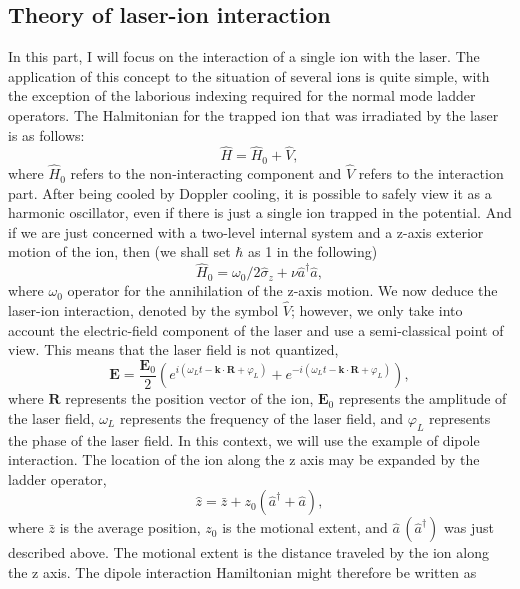 \subsection{Theory of laser-ion interaction}

In this part, I will focus on the interaction of a single ion with the laser. The application of this concept to the situation of several ions is quite simple, with the exception of the laborious indexing required for the normal mode ladder operators. The Halmitonian for the trapped ion that was irradiated by the laser is as follows:
\begin{equation}
    \hat{H} = \hat{H}_0 + \hat{V},
\end{equation}
where $\hat{H}_0$ refers to the non-interacting component and $\hat{V}$ refers to the interaction part. After being cooled by Doppler cooling, it is possible to safely view it as a harmonic oscillator, even if there is just a single ion trapped in the potential. And if we are just concerned with a two-level internal system and a z-axis exterior motion of the ion, then (we shall set $\hbar$ as 1 in the following)
\begin{equation}
    \hat{H}_0=\omega_0 /2 \hat{\sigma}_z + \nu \hat{a}^{\dagger} \hat{a},
\end{equation}
where $\omega_0$ operator for the annihilation of the z-axis motion. We now deduce the laser-ion interaction, denoted by the symbol $\hat{V}$; however, we only take into account the electric-field component of the laser and use a semi-classical point of view. This means that the laser field is not quantized,
\begin{equation}
    \mathbf{E}=\frac{\mathbf{E}_0}{2}\left(e^{i\left(\omega_L t-\mathbf{k} \cdot \mathbf{R}+\varphi_L\right)}+e^{-i\left(\omega_L t-\mathbf{k} \cdot \mathbf{R}+\varphi_L\right)}\right),
\end{equation}
where $\mathbf{R}$ represents the position vector of the ion, $\mathbf{E}_0$ represents the amplitude of the laser field, $\omega_L$ represents the frequency of the laser field, and $\varphi_L$ represents the phase of the laser field. In this context, we will use the example of dipole interaction. The location of the ion along the z axis may be expanded by the ladder operator,
\begin{equation}
    \hat{z}=\bar{z} + z_0 (\hat{a}^{\dagger}+\hat{a}),
\end{equation}
where $\bar{z}$ is the average position, $z_0$ is the motional extent, and $\hat{a}\, (\hat{a}^{\dagger})$ was just described above. The motional extent is the distance traveled by the ion along the z axis. The dipole interaction Hamiltonian might therefore be written as
